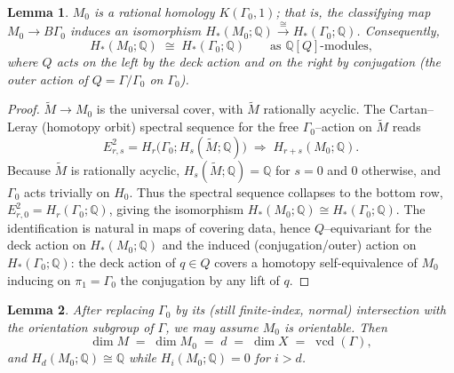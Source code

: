 \documentclass[12pt]{article}
\newcommand{\bQ}{\mathbb{Q}}
\DeclareMathOperator{\vcd}{vcd}
\newtheorem{lemma}{Lemma}
\theoremstyle{definition}
\begin{document}
\begin{lemma}\label{lem:qhomology}
$M_0$ is a rational homology $K(\Gamma_0,1)$; that is, the classifying map
$M_0\to B\Gamma_0$ induces an isomorphism $H_*(M_0;\bQ)\xrightarrow{\ \cong\ }
H_*(\Gamma_0;\bQ)$.  Consequently,
\[
   H_*(M_0;\bQ)\;\cong\;H_*(\Gamma_0;\bQ)
   \qquad\text{as }\bQ[Q]\text{-modules,}
\]
where $Q$ acts on the left by the deck action and on the right by conjugation
(the outer action of $Q=\Gamma/\Gamma_0$ on $\Gamma_0$).
\end{lemma}

\begin{proof}
$\widetilde M\to M_0$ is the universal cover, with $\widetilde M$ rationally
acyclic.  The Cartan--Leray (homotopy orbit) spectral sequence for the free
$\Gamma_0$--action on $\widetilde M$ reads
\[
   E^2_{r,s}=H_r\!\bigl(\Gamma_0;H_s(\widetilde M;\bQ)\bigr)
   \;\Longrightarrow\; H_{r+s}(M_0;\bQ).
\]
Because $\widetilde M$ is rationally acyclic, $H_s(\widetilde M;\bQ)=\bQ$ for
$s=0$ and $0$ otherwise, and $\Gamma_0$ acts trivially on $H_0$.  Thus the
spectral sequence collapses to the bottom row,
$E^2_{r,0}=H_r(\Gamma_0;\bQ)$, giving the isomorphism
$H_*(M_0;\bQ)\cong H_*(\Gamma_0;\bQ)$.  The identification is natural in maps of
covering data, hence $Q$--equivariant for the deck action on $H_*(M_0;\bQ)$ and
the induced (conjugation/outer) action on $H_*(\Gamma_0;\bQ)$: the deck action of
$q\in Q$ covers a homotopy self-equivalence of $M_0$ inducing on
$\pi_1=\Gamma_0$ the conjugation by any lift of $q$.
\end{proof}

\begin{lemma}\label{lem:dimension}
After replacing $\Gamma_0$ by its (still finite-index, normal) intersection with
the orientation subgroup of $\Gamma$, we may assume $M_0$ is orientable.  Then
\[
   \dim M \;=\; \dim M_0 \;=\; d \;=\; \dim X \;=\; \vcd(\Gamma),
\]
and $H_d(M_0;\bQ)\cong\bQ$ while $H_i(M_0;\bQ)=0$ for $i>d$.
\end{lemma}
\end{document}

